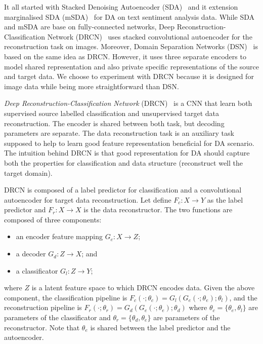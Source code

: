 It all started with Stacked Denoising Autoencoder (SDA)~\cite{glorot2011}
and it extension marginalised SDA (mSDA)~\cite{chen2012} for DA on text sentiment analysis data.
While SDA and mSDA are base on fully-connected networks,
Deep Reconstruction-Classification Network (DRCN)~\cite{ghifary2016}
uses stacked convolutional autoencoder for the reconstruction task on images.
Moreover, Domain Separation Networks (DSN)~\cite{bousmalis2016} is based on the same idea as DRCN.
However, it uses three separate encoders to model shared representation
and also private specific representations of the source and target data.
We choose to experiment with DRCN
because it is designed for image data while being more straightforward than DSN.

\textit{Deep Reconstruction-Classification Network} (DRCN)~\cite{ghifary2016} is a CNN that learn both supervised source labelled classification and unsupervised target data reconstruction.
The encoder is shared between both task, but decoding parameters are separate.
The data reconstruction task is an auxiliary task supposed to help to learn good feature representation beneficial for DA scenario.
The intuition behind DRCN is
that good representation for DA should capture both the properties for classification and data structure
(reconstruct well the target domain).

DRCN is composed of a label predictor for classification
and a convolutional autoencoder for target data reconstruction.
Let define \(F_c: X \to Y\) as the label predictor
and \(F_r: X \to X\) is the data reconstructor.
The two functions are composed of three components:

\begin{itemize}
	\item an encoder feature mapping \(G_e: X \to Z\);
	\item a decoder \(G_d: Z \to X\); and
	\item a classificator \(G_l: Z \to Y\);
\end{itemize}

where \(Z\) is a latent feature space to which DRCN encodes data.
Given the above component,
the classification pipeline is \(F_c(\cdot; \theta_c) = G_l(G_e(\cdot; \theta_e); \theta_l)\),
and the reconstruction pipeline is \(F_r(\cdot; \theta_r) = G_d(G_e(\cdot; \theta_e); \theta_d)\)
where \(\theta_c = \{\theta_e, \theta_l\}\) are parameters of the classificator
and \(\theta_r = \{\theta_d, \theta_e\}\) are parameters of the reconstructor.
Note that \(\theta_e\) is shared between the label predictor and the autoencoder.

